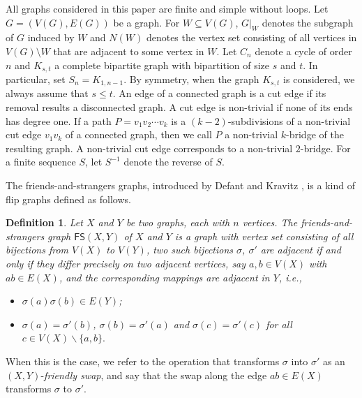 \documentclass[11pt]{article}
\newtheorem{defn}[thm]{Definition}%
\begin{document}
 All graphs considered in this paper are finite and simple without loops. Let $G=(V(G),E(G))$ be a graph. For $W\subseteq V(G)$, $G|_W$ denotes the subgraph of $G$ induced by $W$ and $N(W)$ denotes the vertex set consisting of all vertices in $V(G)\setminus W$ that are adjacent to some vertex in $W$. Let $C_n$ denote a cycle of order $n$ and $K_{s,t}$  a complete bipartite graph with   bipartition of size $s$ and $t$. In particular, set $S_n=K_{1,n-1}$. By symmetry, when the graph $K_{s,t}$ is considered, we always assume that $s\le t$.  
An edge of a connected graph is a cut edge if its removal results a disconnected graph.   A cut edge is non-trivial if  none of  its ends has degree one. If a path $P=v_1v_2\cdots v_k$ is a $(k-2)$-subdivisions of a non-trivial cut edge $v_1v_k$ of a connected graph, then we call $P$ a non-trivial $k$-bridge of the resulting graph.   
A non-trivial cut edge corresponds to a non-trivial $2$-bridge. For a finite sequence $S$, let $S^{-1}$ denote the reverse of $S$. 

The friends-and-strangers graphs, introduced by Defant and Kravitz \cite{DK}, is a kind of flip graphs defined as follows. 


 \begin{defn}\cite{DK} 
Let $X$ and $Y$ be two graphs, each with $n$ vertices. The friends-and-strangers graph $\mathsf{FS}(X,Y)$ of $X$ and $Y$ is a graph with vertex set consisting of all bijections from $V(X)$ to $V(Y)$, two such bijections $\sigma$, $\sigma'$ are adjacent if and only if they differ precisely on two adjacent vertices, say $a,b\in V(X)$ with $ab\in E(X)$, and the corresponding mappings are adjacent in $Y$, i.e.,
\begin{itemize}
\item  $\sigma(a)\sigma(b) \in E(Y)$;
\item  $\sigma(a)=\sigma'(b)$, $\sigma(b)=\sigma'(a)$ and $\sigma(c)=\sigma'(c)$ for all $c\in V(X)\backslash \{a,b\}.$
\end{itemize}
\end{defn}

 When this is the case, we refer to the operation that transforms $\sigma$ into $\sigma'$ as an $(X,Y)$-{\it friendly swap}, and say that the  swap along the edge $ab\in E(X)$ transforms $\sigma$ to $\sigma'$. 
\end{document}

